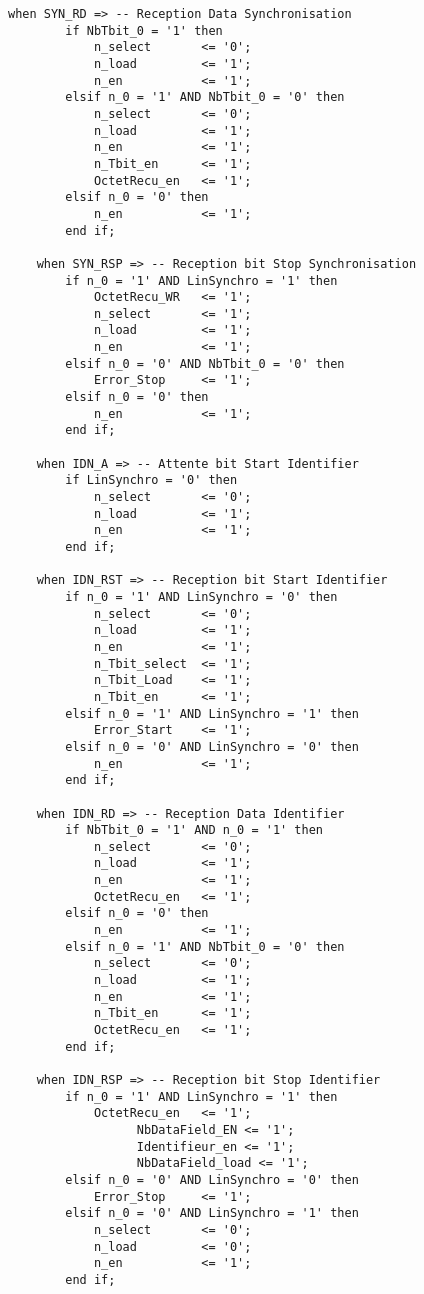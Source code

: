 \begin{lstlisting}[style=VHDLStyle, caption={Réseau Combinatoire de Sortie Reception Trame}]
    when SYN_RD => -- Reception Data Synchronisation
        if NbTbit_0 = '1' then
            n_select       <= '0';
            n_load         <= '1';
            n_en           <= '1';
        elsif n_0 = '1' AND NbTbit_0 = '0' then
            n_select       <= '0';
            n_load         <= '1';
            n_en           <= '1';
            n_Tbit_en      <= '1';
            OctetRecu_en   <= '1';
        elsif n_0 = '0' then
            n_en           <= '1';
        end if;
        
    when SYN_RSP => -- Reception bit Stop Synchronisation
        if n_0 = '1' AND LinSynchro = '1' then
            OctetRecu_WR   <= '1';
            n_select       <= '1';
            n_load         <= '1';
            n_en           <= '1';
        elsif n_0 = '0' AND NbTbit_0 = '0' then
            Error_Stop     <= '1';
        elsif n_0 = '0' then
            n_en           <= '1';
        end if;
        
    when IDN_A => -- Attente bit Start Identifier
        if LinSynchro = '0' then
            n_select       <= '0';
            n_load         <= '1';
            n_en           <= '1';
        end if;
        
    when IDN_RST => -- Reception bit Start Identifier
        if n_0 = '1' AND LinSynchro = '0' then
            n_select       <= '0';
            n_load         <= '1';
            n_en           <= '1';
            n_Tbit_select  <= '1';
            n_Tbit_Load    <= '1';
            n_Tbit_en      <= '1';
        elsif n_0 = '1' AND LinSynchro = '1' then
            Error_Start    <= '1';
        elsif n_0 = '0' AND LinSynchro = '0' then
            n_en           <= '1';
        end if;   
            
    when IDN_RD => -- Reception Data Identifier
        if NbTbit_0 = '1' AND n_0 = '1' then
            n_select       <= '0';
            n_load         <= '1';
            n_en           <= '1';
			OctetRecu_en   <= '1';
        elsif n_0 = '0' then
            n_en           <= '1';
        elsif n_0 = '1' AND NbTbit_0 = '0' then
			n_select       <= '0';
			n_load         <= '1';
            n_en           <= '1';
			n_Tbit_en      <= '1';
            OctetRecu_en   <= '1';
        end if; 
            
    when IDN_RSP => -- Reception bit Stop Identifier
        if n_0 = '1' AND LinSynchro = '1' then
            OctetRecu_en   <= '1';
			      NbDataField_EN <= '1';
			      Identifieur_en <= '1';
			      NbDataField_load <= '1';
        elsif n_0 = '0' AND LinSynchro = '0' then
            Error_Stop     <= '1';
        elsif n_0 = '0' AND LinSynchro = '1' then
            n_select       <= '0';
            n_load         <= '0';
            n_en           <= '1';
        end if;   
        

\end{lstlisting}
